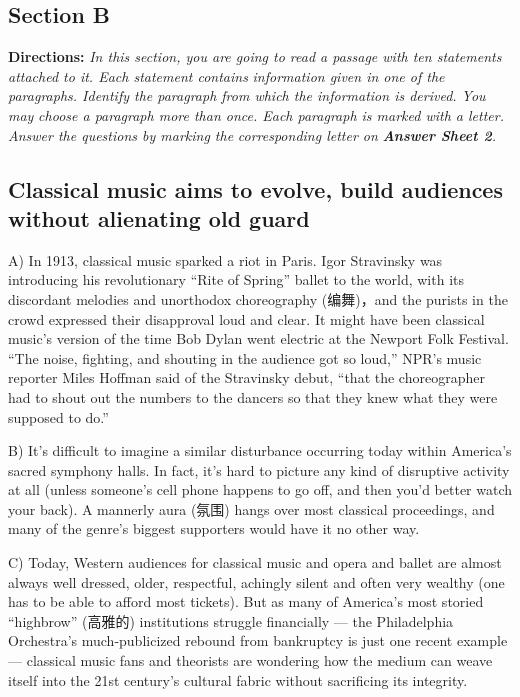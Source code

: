 \documentclass[UTF8,11pt]{ctexart}
\begin{document}
\subsection*{\textbf{Section B}}


\textbf{Directions:} \textit{In this section, you are going to read a passage with ten statements attached to it. Each statement contains} \textit{information given in one of the paragraphs. Identify the paragraph from which the information is derived. You may} \textit{choose a paragraph more than once. Each paragraph is marked with a letter. Answer the questions by marking the} \textit{corresponding letter on }\textbf{\textit{Answer Sheet 2}}\textit{.}


\subsection*{\textbf{Classical music aims to evolve, build audiences without alienating old guard}}


A) In 1913, classical music sparked a riot in Paris. Igor Stravinsky was introducing his revolutionary “Rite of Spring” ballet to the world, with its discordant melodies and unorthodox choreography (编舞)，and the purists in the crowd expressed their disapproval loud and clear. It might have been classical music’s version of the time Bob Dylan went electric at the Newport Folk Festival. “The noise, fighting, and shouting in the audience got so loud,” NPR’s music reporter Miles Hoffman said of the Stravinsky debut, “that the choreographer had to shout out the numbers to the dancers so that they knew what they were supposed to do.”


B) It’s difficult to imagine a similar disturbance occurring today within America’s sacred symphony halls. In fact, it’s hard to picture any kind of disruptive activity at all (unless someone’s cell phone happens to go off, and then you’d better watch your back). A mannerly aura (氛围) hangs over most classical proceedings, and many of the genre’s biggest supporters would have it no other way.


C) Today, Western audiences for classical music and opera and ballet are almost always well dressed, older, respectful, achingly silent and often very wealthy (one has to be able to afford most tickets). But as many of America’s most storied “highbrow” (高雅的) institutions struggle financially — the Philadelphia Orchestra’s much-publicized rebound from bankruptcy is just one recent example — classical music fans and theorists are wondering how the medium can weave itself into the 21st century’s cultural fabric without sacrificing its integrity.
\end{document}
